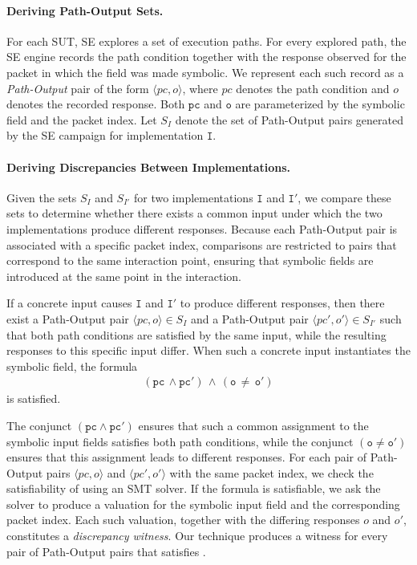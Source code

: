 \paragraph{Deriving Path-Output Sets.}
For each SUT, SE explores a set of execution paths.
For every explored path, the SE engine records the path condition together with the response observed for the packet in which the field was made symbolic.
We represent each such record as a \emph{Path-Output} pair of the form $\langle pc, o \rangle$, where $pc$ denotes the path condition and $o$ denotes the recorded response.
Both $\mathtt{pc}$ and $\mathtt{o}$ are parameterized by the symbolic field and the packet index.
Let $S_I$ denote the set of Path-Output pairs generated by the SE campaign for implementation $\mathtt{I}$.

\paragraph{Deriving Discrepancies Between Implementations.}
Given the sets $S_I$ and $S_{I'}$ for two implementations $\mathtt{I}$ and $\mathtt{I'}$, we compare these sets to determine whether there exists a common input under which the two implementations produce different responses.
Because each Path-Output pair is associated with a specific packet index, comparisons are restricted to pairs that correspond to the same interaction point, ensuring that symbolic fields are introduced at the same point in the interaction.

If a concrete input causes $\mathtt{I}$ and $\mathtt{I'}$ to produce different responses, then there exist a Path-Output pair $\langle pc, o \rangle \in S_I$ and a Path-Output pair $\langle pc', o' \rangle \in S_{I'}$ such that both path conditions are satisfied by the same input, while the resulting responses to this specific input differ.
When such a concrete input instantiates the symbolic field, the formula
\begin{gather}
	\mathtt{(pc \, \land pc') \, \land \, (o \, \neq \, o')}\label{eq:discrepancy}
\end{gather}
is satisfied.

The conjunct $\mathtt{(pc \land pc')}$ ensures that such a common assignment to the symbolic input fields satisfies both path conditions, while the conjunct $\mathtt{(o \neq o')}$ ensures that this assignment leads to different responses.
For each pair of Path-Output pairs $\langle pc, o \rangle$ and $\langle pc', o' \rangle$ with the same packet index, we check the satisfiability of  using an SMT solver.
If the formula is satisfiable, we ask the solver to produce a valuation for the symbolic input field and the corresponding packet index.
Each such valuation, together with the differing responses $o$ and $o'$, constitutes a \emph{discrepancy witness}.
Our technique produces a witness for every pair of Path-Output pairs that satisfies .

